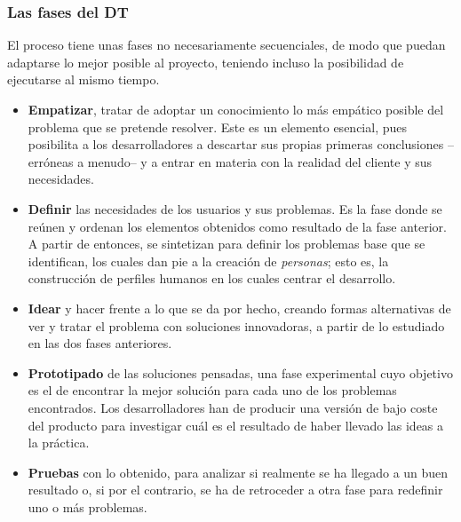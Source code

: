 \subsubsection{Las fases del DT}

El proceso tiene unas fases no necesariamente secuenciales, de modo que puedan adaptarse lo mejor posible al proyecto, teniendo incluso la posibilidad de ejecutarse al mismo tiempo.

\begin{itemize}
	\item \textbf{Empatizar}, tratar de adoptar un conocimiento lo más empático posible del problema que se pretende resolver. Este es un elemento esencial, pues posibilita a los desarrolladores a descartar sus propias primeras conclusiones --erróneas a menudo-- y a entrar en materia con la realidad del cliente y sus necesidades.
	
	\item \textbf{Definir} las necesidades de los usuarios y sus problemas. Es la fase donde se reúnen y ordenan los elementos obtenidos como resultado de la fase anterior. A partir de entonces, se sintetizan para definir los problemas base que se identifican, los cuales dan pie a la creación de \textit{personas}; esto es, la construcción de perfiles humanos en los cuales centrar el desarrollo.
	
	\item \textbf{Idear} y hacer frente a lo que se da por hecho, creando formas alternativas de ver y tratar el problema con soluciones innovadoras, a partir de lo estudiado en las dos fases anteriores.
	
	\item \textbf{Prototipado} de las soluciones pensadas, una fase experimental cuyo objetivo es el de encontrar la mejor solución para cada uno de los problemas encontrados. Los desarrolladores han de producir una versión de bajo coste del producto para investigar cuál es el resultado de haber llevado las ideas a la práctica.
	
	\item \textbf{Pruebas} con lo obtenido, para analizar si realmente se ha llegado a un buen resultado o, si por el contrario, se ha de retroceder a otra fase para redefinir uno o más problemas.
	
\end{itemize}

